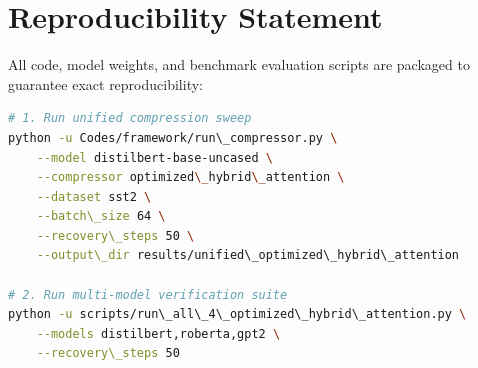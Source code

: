 \section{Reproducibility Statement}
All code, model weights, and benchmark evaluation scripts are packaged to guarantee exact reproducibility:
\begin{lstlisting}[language=bash]
# 1. Run unified compression sweep
python -u Codes/framework/run\_compressor.py \
    --model distilbert-base-uncased \
    --compressor optimized\_hybrid\_attention \
    --dataset sst2 \
    --batch\_size 64 \
    --recovery\_steps 50 \
    --output\_dir results/unified\_optimized\_hybrid\_attention

# 2. Run multi-model verification suite
python -u scripts/run\_all\_4\_optimized\_hybrid\_attention.py \
    --models distilbert,roberta,gpt2 \
    --recovery\_steps 50
\end{lstlisting}
